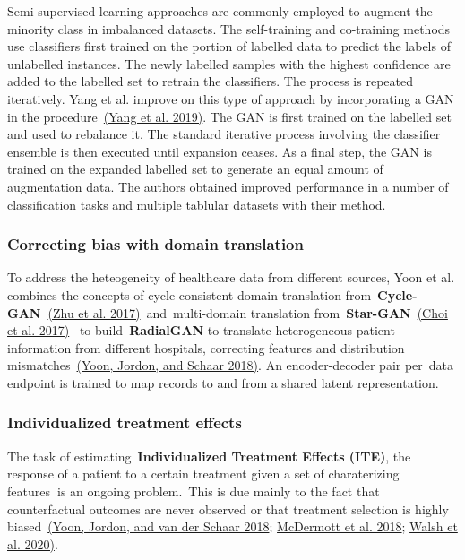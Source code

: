 \documentclass[10pt]{article}
\begin{document}
Semi-supervised learning approaches are commonly employed to augment the
minority class in imbalanced datasets. The self-training and co-training
methods use classifiers first trained on the portion of labelled data to
predict the labels of unlabelled instances. The newly labelled samples
with the highest confidence are added to the labelled set to retrain the
classifiers. The process is repeated iteratively. Yang et al. improve on
this type of approach by incorporating a GAN in the
procedure~\hyperref[csl:24]{(Yang et al. 2019)}. The GAN is first trained on the labelled
set and used to rebalance it. The standard iterative process involving
the classifier ensemble is then executed until expansion ceases. As a
final step, the GAN is trained on the expanded labelled set to generate
an equal amount of augmentation data. The authors obtained improved
performance in a number of classification tasks and multiple tablular
datasets with their method.

\subsubsection{Correcting bias with domain
translation}

To address the heteogeneity of healthcare data from different sources,
Yoon et al. combines the concepts of cycle-consistent domain translation
from~\textbf{Cycle-GAN~}\hyperref[csl:49]{(Zhu et al. 2017)}~and~multi-domain translation
from~\textbf{Star-GAN}~\hyperref[csl:50]{(Choi et al. 2017)}~ to build~\textbf{RadialGAN}
to translate heterogeneous patient information from different hospitals,
correcting features and distribution mismatches~\hyperref[csl:20]{(Yoon, Jordon, and Schaar 2018)}. An
encoder-decoder pair per~data endpoint is trained to map records to and
from a shared latent representation.~

\subsubsection{Individualized treatment
effects}

{\label{162585}}

The task of estimating~\textbf{Individualized Treatment Effects (ITE)},
the response of a patient to a certain treatment given a set of
charaterizing features\textbf{~}is an ongoing problem.~This is due
mainly to the fact that counterfactual outcomes are never observed or
that treatment selection is highly biased~\hyperref[csl:21]{(Yoon, Jordon, and van der Schaar 2018}; \hyperref[csl:8]{McDermott et al. 2018}; \hyperref[csl:12]{Walsh et al. 2020)}.~
\end{document}
